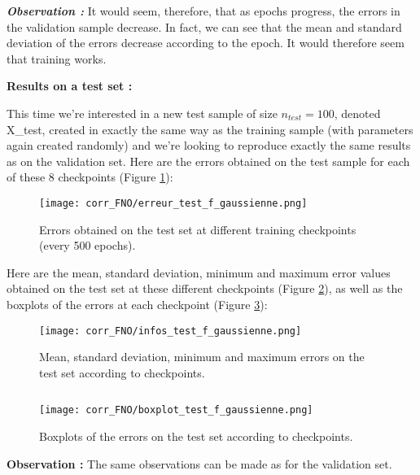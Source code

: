 \textbf{\textit{Observation :}} It would seem, therefore, that as epochs progress, the errors in the validation sample decrease. In fact, we can see that the mean and standard deviation of the errors decrease according to the epoch. It would therefore seem that training works.

\newpage

\textbf{Results on a test set :}

This time we're interested in a new test sample of size $n_{test}=100$, denoted X\_test, created in exactly the same way as the training sample (with parameters again created randomly) and we're looking to reproduce exactly the same results as on the validation set. Here are the errors obtained on the test sample for each of these 8 checkpoints (Figure \ref{erreur_test_f_gaussienne}):

\begin{figure}[H]
	\centering
	\texttt{[image: corr\_FNO/erreur\_test\_f\_gaussienne.png]}
	\caption{Errors obtained on the test set at different training checkpoints (every 500 epochs).}
	\label{erreur_test_f_gaussienne}
\end{figure} 

Here are the mean, standard deviation, minimum and maximum error values obtained on the test set at these different checkpoints (Figure \ref{infos_test_f_gaussienne}), as well as the boxplots of the errors at each checkpoint (Figure \ref{boxplot_test_f_gaussienne}):

\begin{minipage}{0.48\linewidth}
	\begin{figure}[H]
		\centering
		\texttt{[image: corr\_FNO/infos\_test\_f\_gaussienne.png]}
		\caption{Mean, standard deviation, minimum and maximum errors on the test set according to checkpoints.}
		\label{infos_test_f_gaussienne}
	\end{figure} 
\end{minipage} $\qquad$
\begin{minipage}{0.48\linewidth}
	\begin{figure}[H]
		\centering
		\texttt{[image: corr\_FNO/boxplot\_test\_f\_gaussienne.png]}
		\caption{Boxplots of the errors on the test set according to checkpoints.}
		\label{boxplot_test_f_gaussienne}
	\end{figure} 
\end{minipage}

\textbf{Observation :} The same observations can be made as for the validation set.

